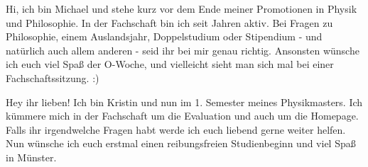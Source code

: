 \begin{multicols}{2}
\small


{
Hi, ich bin Michael und stehe kurz vor dem Ende meiner Promotionen in Physik und Philosophie. In der Fachschaft bin ich seit Jahren aktiv. 
Bei Fragen zu Philosophie, einem Auslandsjahr, Doppelstudium oder Stipendium - und natürlich auch allem anderen - seid ihr bei mir genau richtig. Ansonsten wünsche ich euch viel Spaß der O-Woche, und vielleicht sieht man sich mal bei einer Fachschaftssitzung. :)
}

\vspace{-0.4cm}

{
Hey ihr lieben! Ich bin Kristin und nun im 1. Semester meines Physikmasters. Ich kümmere mich in der Fachschaft um die Evaluation und auch um die Homepage. 
Falls ihr irgendwelche Fragen habt werde ich euch liebend gerne weiter helfen. Nun wünsche ich euch erstmal einen reibungsfreien Studienbeginn und viel Spaß in Münster. 
}


\end{multicols}
